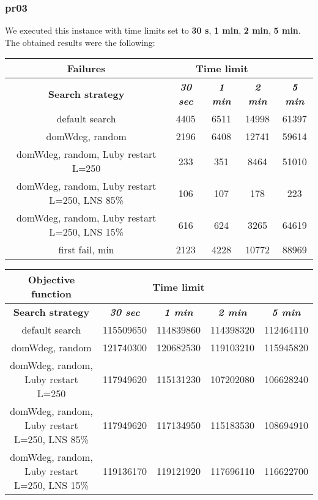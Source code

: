 \subsubsection{pr03}
We executed this instance with time limits set to \textbf{30 s}, \textbf{1 min}, \textbf{2 min}, \textbf{5 min}.\\
The obtained results were the following:
{
\renewcommand{\arraystretch}{2}
\begin{longtable}[h]{| c | c | c | c | c |}
    \hline
    \textbf{Failures} & \multicolumn{3}{c}{Time limit} & \\
    \hline
    \textbf{Search strategy} & \textbf{\textit{30 sec}} & \textbf{\textit{1 min}} & \textbf{\textit{2 min}} & \textbf{\textit{5 min}} \\
    \hline
    \endhead
    default search                                &  4405 &  6511 & 14998 &  61397 \\
    \hline
    domWdeg, random                               &  2196 &  6408 & 12741 &  59614 \\
    \hline
    domWdeg, random, Luby restart L=250           &   233 &   351 &  8464 &  51010 \\
    \hline
    domWdeg, random, Luby restart L=250, LNS 85\% &   106 &   107 &   178 &    223 \\
    \hline
    domWdeg, random, Luby restart L=250, LNS 15\% &   616 &   624 &  3265 &  64619 \\
    \hline
    first fail, min                               &  2123 &  4228 & 10772 &  88969 \\
    \hline
\end{longtable}
}

{
\renewcommand{\arraystretch}{2}
\begin{longtable}[h]{| c | c | c | c | c |}
    \hline
    \textbf{Objective function} & \multicolumn{3}{c}{Time limit} & \\
    \hline
    \textbf{Search strategy} & \textbf{\textit{30 sec}} & \textbf{\textit{1 min}} & \textbf{\textit{2 min}} & \textbf{\textit{5 min}} \\
    \hline
    \endhead
    default search                                & 115509650 & 114839860 & 114398320 & 112464110 \\
    \hline
    domWdeg, random                               & 121740300 & 120682530 & 119103210 & 115945820 \\
    \hline
    domWdeg, random, Luby restart L=250           & 117949620 & 115131230 & 107202080 & 106628240 \\
    \hline
    domWdeg, random, Luby restart L=250, LNS 85\% & 117949620 & 117134950 & 115183530 & 108694910 \\
    \hline
    domWdeg, random, Luby restart L=250, LNS 15\% & 119136170 & 119121920 & 117696110 & 116622700 \\
    \hline
\end{longtable}
}
